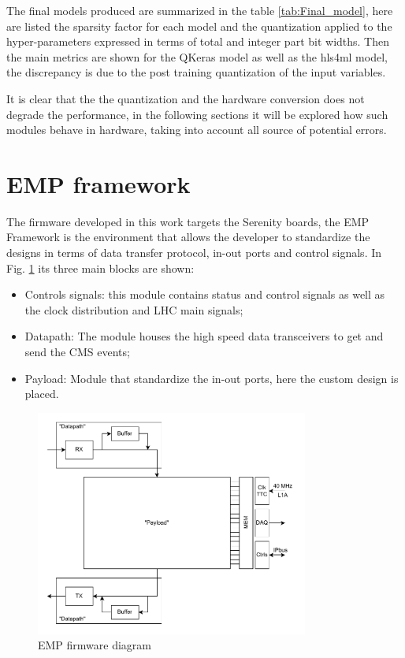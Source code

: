\documentclass[../../main.tex]{subfiles}
\begin{document}
The final models produced are summarized in the table \ref{tab:Final_model}, here are listed the sparsity factor for each model and the quantization applied to the hyper-parameters expressed in terms of total and integer part bit widths. Then the main metrics are shown for the QKeras model as well as the hls4ml model, the discrepancy is due to the post training quantization of the input variables.  

It is clear that the the quantization and the hardware conversion does not degrade the performance, in the following sections it will be explored how such modules behave in hardware, taking into account all source of potential errors.   


\section{EMP framework}
\label{EMP}

The firmware developed in this work targets the Serenity boards, the EMP Framework \cite{EMP}  is the environment that allows the developer to standardize the designs in terms of data transfer protocol, in-out ports and control signals.  
In Fig. \ref{fig:EMP-fw} its three main blocks are shown:
\begin{itemize}
    \item Controls signals: this module contains status and control signals as well as the clock distribution and LHC main signals;
    \item Datapath: The module houses the high speed data transceivers to get and send the CMS events;
    \item Payload: Module that standardize the in-out ports, here the custom design is placed.
\end{itemize}

\begin{figure}[h]
    \centering
    \includegraphics[width=0.8\textwidth]{sections/05/Images/EMP-fwk.pdf}
    \caption{EMP firmware diagram}
    \label{fig:EMP-fw}
\end{figure}
\end{document}
